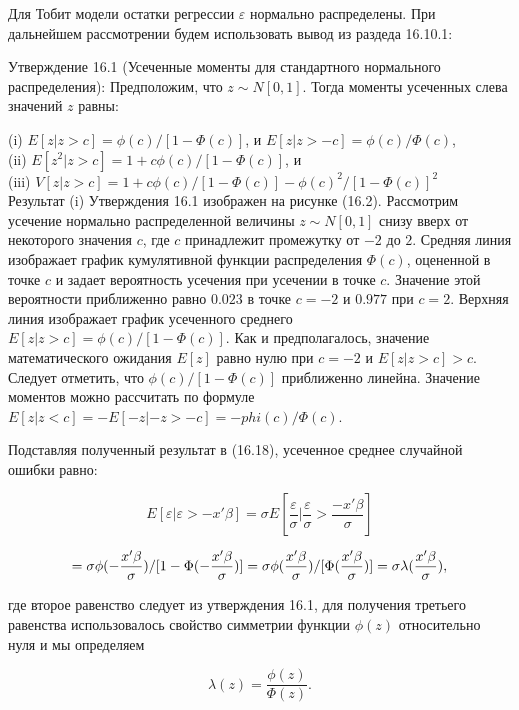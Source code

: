 Для Тобит модели остатки регрессии $\varepsilon$ нормально распределены. При дальнейшем рассмотрении будем использовать вывод из раздеда 16.10.1:

Утверждение 16.1 (Усеченные моменты для стандартного нормального распределения): Предположим, что $z{\sim}N[0,1]$. Тогда моменты усеченных слева значений $z$ равны:


(i) $E[z|z>c]=\phi(c)/[1-\Phi(c)]$, и $E[z|z>-c]=\phi(c)/\Phi(c)$,\\
 (ii) $E[z^{2}|z>c]=1+c\phi(c)/[1-\Phi(c)]$, и \\
 (iii) $V[z|z>c]=1+c\phi(c)/[1-\Phi(c)]-\phi(c)^{2}/[1-\Phi(c)]^{2}$ \\

Результат (i) Утверждения 16.1 изображен на рисунке (16.2). Рассмотрим усечение нормально распределенной величины $z{\sim}N[0,1]$ снизу вверх от некоторого значения $c$, где $c$ принадлежит промежутку от $-2$ до $2$. Средняя линия изображает график кумулятивной функции распределения $\Phi(c)$, оцененной в точке $c$ и задает вероятность усечения при усечении в точке $c$. Значение этой вероятности приближенно равно $0.023$ в точке $c=-2$ и $0.977$ при $c=2$. Верхняя линия изображает график усеченного среднего $E[z|z>c]=\phi(c)/[1-\Phi(c)]$. Как и предполагалось, значение математического ожидания $E[z]$ равно нулю при $c=-2$ и $E[z|z>c]>c$. Следует отметить, что $\phi(c)/[1-\Phi(c)]$ приближенно линейна. Значение моментов можно рассчитать по формуле $E[z|z<c]=-E[-z|-z>-c]=-phi(c)/\Phi(c)$. 

Подставляя полученный результат в (16.18), усеченное среднее случайной ошибки равно:

\begin{equation}
E[\varepsilon|\varepsilon>{-x}'\beta]={\sigma}E[\dfrac{\varepsilon}{\sigma}|\dfrac{\varepsilon}{\sigma}>\dfrac{{-x}'\beta}{\sigma}]  
\end{equation}

\[
=\sigma\phi(-\dfrac{x'\beta}{\sigma})/[1-\Phi(-\dfrac{x'\beta}{\sigma})] \\
=\sigma\phi(\dfrac{x'\beta}{\sigma})/[\Phi(\dfrac{x'\beta}{\sigma})] \\
=\sigma\lambda(\dfrac{x'\beta}{\sigma}),
\]

где второе равенство следует из утверждения 16.1, для получения третьего равенства использовалось свойство симметрии функции $\phi(z)$ относительно нуля и мы определяем 

\begin{equation}
\lambda(z)=\dfrac{\phi(z)}{\Phi(z)}.
\end{equation}

